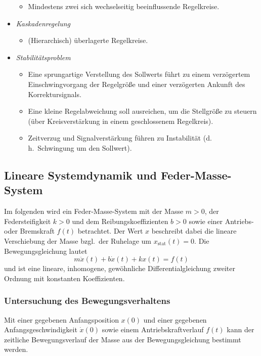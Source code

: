 \documentclass[a4paper, 11pt, accentcolor = tud3b]{tudreport}
\renewcommand{\dh}{d.\,h.~}
\newcommand{\bzgl}{bzgl.~}
\begin{document}
\begin{itemize}
						\begin{itemize}
							\item Mindestens zwei sich wechselseitig beeinflussende Regelkreise.
						\end{itemize}
					\item \emph{Kaskadenregelung}
						\begin{itemize}
							\item (Hierarchisch) überlagerte Regelkreise.
						\end{itemize}
					\item \emph{Stabilitätsproblem}
						\begin{itemize}
							\item Eine sprungartige Verstellung des Sollwerts führt zu einem verzögertem Einschwingvorgang der Regelgröße und einer verzögerten Ankunft des Korrektursignals.
							\item Eine kleine Regelabweichung soll ausreichen, um die Stellgröße zu steuern (über Kreisverstärkung in einem geschlossenem Regelkreis).
							\item Zeitverzug und Signalverstärkung führen zu Instabilität (\dh Schwingung um den Sollwert).
						\end{itemize}
				\end{itemize}

			\subsection{Lineare Systemdynamik und Feder-Masse-System} %
				Im folgenden wird ein Feder-Masse-System mit der Masse \( m > 0 \), der Federsteifigkeit \( k > 0 \) und dem Reibungskoeffizienten \( b > 0 \) sowie einer Antriebs- oder Bremskraft \( f(t) \) betrachtet. Der Wert \( x \) beschreibt dabei die lineare Verschiebung der Masse \bzgl der Ruhelage um \( x_\text{stat}(t) = 0 \). Die Bewegungsgleichung lautet
				\begin{equation*}
					m\ddot{x}(t) + b\dot{x}(t) + kx(t) = f(t)
				\end{equation*}
				und ist eine lineare, inhomogene, gewöhnliche Differentialgleichung zweiter Ordnung mit konstanten Koeffizienten.

				\subsubsection{Untersuchung des Bewegungsverhaltens} %
					Mit einer gegebenen Anfangsposition \( x(0) \) und einer gegebenen Anfangsgeschwindigkeit \( \dot{x}(0) \) sowie einem Antriebskraftverlauf \( f(t) \) kann der zeitliche Bewegungsverlauf der Masse aus der Bewegungsgleichung bestimmt werden.
					
\end{document}

